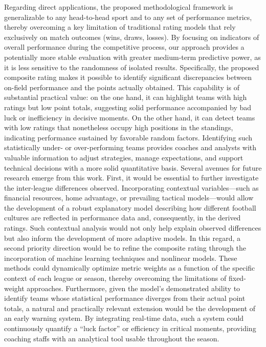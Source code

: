 \documentclass[preprint,12pt]{elsarticle}
\begin{document}
%
Regarding direct applications, the proposed methodological framework is generalizable to any head-to-head sport and to any set of performance metrics, thereby overcoming a key limitation of traditional rating models that rely exclusively on match outcomes (wins, draws, losses). By focusing on indicators of overall performance during the competitive process, our approach provides a potentially more stable evaluation with greater medium-term predictive power, as it is less sensitive to the randomness of isolated results.
%
Specifically, the proposed composite rating makes it possible to identify significant discrepancies between on-field performance and the points actually obtained. This capability is of substantial practical value: on the one hand, it can highlight teams with high ratings but low point totals, suggesting solid performance accompanied by bad luck or inefficiency in decisive moments. On the other hand, it can detect teams with low ratings that nonetheless occupy high positions in the standings, indicating performance sustained by favorable random factors. Identifying such statistically under- or over-performing teams provides coaches and analysts with valuable information to adjust strategies, manage expectations, and support technical decisions with a more solid quantitative basis.
%
Several avenues for future research emerge from this work. First, it would be essential to further investigate the inter-league differences observed. Incorporating contextual variables—such as financial resources, home advantage, or prevailing tactical models—would allow the development of a robust explanatory model describing how different football cultures are reflected in performance data and, consequently, in the derived ratings.
%
Such contextual analysis would not only help explain observed differences but also inform the development of more adaptive models. In this regard, a second priority direction would be to refine the composite rating through the incorporation of machine learning techniques and nonlinear models. These methods could dynamically optimize metric weights as a function of the specific context of each league or season, thereby overcoming the limitations of fixed-weight approaches.
%
Furthermore, given the model’s demonstrated ability to identify teams whose statistical performance diverges from their actual point totals, a natural and practically relevant extension would be the development of an early warning system. By integrating real-time data, such a system could continuously quantify a ``luck factor'' or efficiency in critical moments, providing coaching staffs with an analytical tool usable throughout the season.
\end{document}
